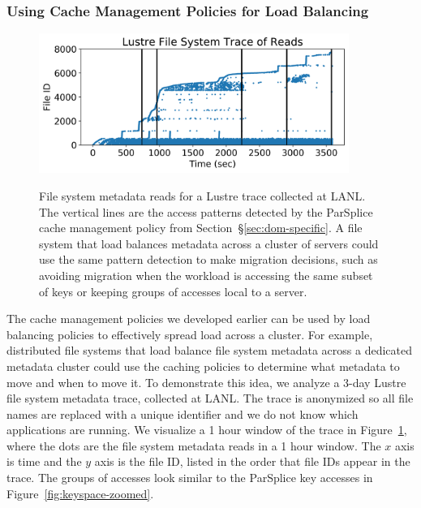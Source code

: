 \subsubsection{Using Cache Management Policies for Load Balancing}

\begin{figure}[t]
\centering
\includegraphics[width=0.9\textwidth]{./chapters/controlplane/parsplice/figures/trace-atime.png}\\
\caption{File system metadata reads for a Lustre trace collected at LANL. The
vertical lines are the access patterns detected by the ParSplice cache
management policy from Section~\S\ref{sec:dom-specific}. A file system that
load balances metadata across a cluster of servers could use the same pattern
detection to make migration decisions, such as avoiding migration when the
workload is accessing the same subset of keys or keeping groups of accesses
local to a server.  \label{fig:trace-atime}}
\end{figure}


The cache management policies we developed earlier can be used by load
balancing policies to effectively spread load across a cluster. For example,
distributed file systems that load balance file system metadata across a
dedicated metadata cluster could use the caching policies to determine what
metadata to move and when to move it.  To demonstrate this idea, we analyze a
3-day Lustre file system metadata trace, collected at LANL.  The trace is
anonymized so all file names are replaced with a unique identifier and we do
not know which applications are running. We visualize a 1 hour window of the
trace in Figure~\ref{fig:trace-atime}, where the dots are the file system
metadata reads in a 1 hour window.  The \(x\) axis is time and the \(y\) axis
is the file ID, listed in the order that file IDs appear in the trace.  The
groups of accesses look similar to the ParSplice key accesses in
Figure~\ref{fig:keyspace-zoomed}. 

